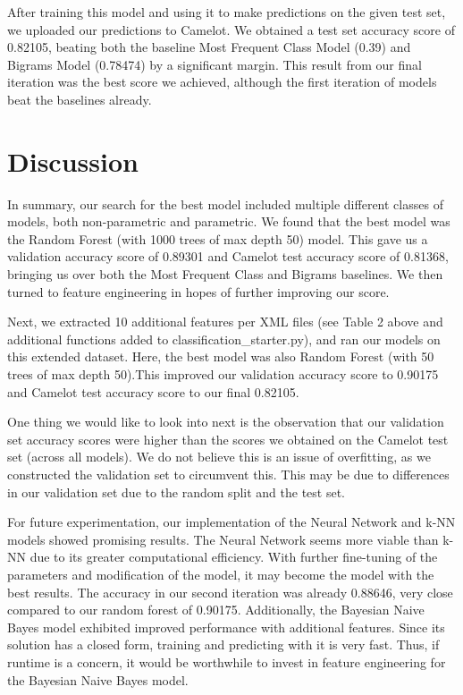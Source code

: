 \documentclass[11pt]{article}
\begin{document}
After training this model and using it to make predictions on the given test set, we uploaded our predictions to Camelot. We obtained a test set accuracy score of 0.82105, beating both the baseline Most Frequent Class Model (0.39) and Bigrams Model (0.78474) by a significant margin. This result from our final iteration was the best score we achieved, although the first iteration of models beat the baselines already.


\section{Discussion} 



In summary, our search for the best model included multiple different classes of models, both non-parametric and parametric. We found that the best model was the Random Forest (with 1000 trees of max depth 50) model. This gave us a validation accuracy score of 0.89301 and Camelot test accuracy score of 0.81368, bringing us over both the Most Frequent Class and Bigrams baselines. We then turned to feature engineering in hopes of further improving our score.
    
Next, we extracted 10 additional features per XML files (see Table 2 above and additional functions added to classification\_starter.py), and ran our models on this extended dataset. Here, the best model was also Random Forest (with 50 trees of max depth 50).This improved our validation accuracy score to 0.90175 and Camelot test accuracy score to our final 0.82105.

One thing we would like to look into next is the observation that our validation set accuracy scores were higher than the scores we obtained on the Camelot test set (across all models). We do not believe this is an issue of overfitting, as we constructed the validation set to circumvent this. This may be due to differences in our validation set due to the random split and the test set.

For future experimentation, our implementation of the Neural Network and k-NN models showed promising results. The Neural Network seems more viable than k-NN due to its greater computational efficiency. With further fine-tuning of the parameters and modification of the model, it may become the model with the best results. The accuracy in our second iteration was already 0.88646, very close compared to our random forest of 0.90175. Additionally, the Bayesian Naive Bayes model exhibited improved performance with additional features. Since its solution has a closed form, training and predicting with it is very fast. Thus, if runtime is a concern, it would be worthwhile to invest in feature engineering for the Bayesian Naive Bayes model.
 
\end{document}

